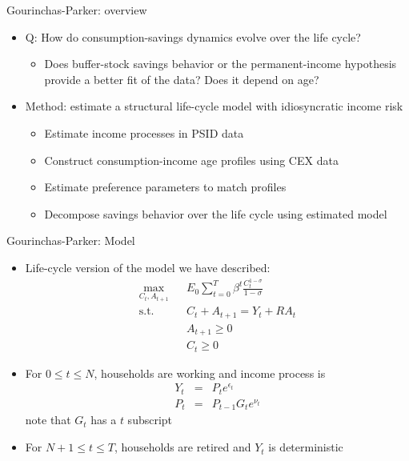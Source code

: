 \documentclass[9pt]{beamer}
\newcommand{\bit}{\begin{itemize}}
\newcommand{\eit}{\end{itemize}}
\begin{document}
\begin{frame}{Gourinchas-Parker: overview}

\bit
\setlength\itemsep{1.5em}
\item Q: How do consumption-savings dynamics evolve over the life cycle?
\bit
	\item Does buffer-stock savings behavior or the permanent-income hypothesis provide a better fit of the data? Does it depend on age?
\eit

\item Method: estimate a structural life-cycle model with idiosyncratic income risk
\bit
\setlength\itemsep{0.5em}
	\item Estimate income processes in PSID data 
	
	\item Construct consumption-income age profiles using CEX data
	
	\item Estimate preference parameters to match profiles
	
	\item Decompose savings behavior over the life cycle using estimated model
\eit

\eit

\end{frame}


\begin{frame}{Gourinchas-Parker: Model}

\bit
\setlength\itemsep{1.5em}
\item Life-cycle version of the model we have described:
\begin{eqnarray}
\max_{C_t, A_{t+1}} && E_0 \sum_{t=0}^{T} \beta^t \frac{C_t^{1-\sigma}}{1-\sigma} \nonumber \\
\text{s.t.} && C_t + A_{t+1} = Y_t + R A_t \nonumber \\
&& A_{t+1} \geq 0 \nonumber \\
&& C_{t} \geq 0 \nonumber
\end{eqnarray}

\item For $0 \leq t \leq N$, households are working and income process is
\begin{eqnarray}
Y_{t} &=& P_{t} e^{\epsilon_{t}} \nonumber \\
P_{t} &=& P_{t-1}G_t e^{\nu_{t}} \nonumber 
\end{eqnarray}
note that $G_t$ has a $t$ subscript

\item For $N+1 \leq t \leq T$, households are retired and $Y_t$ is deterministic

\eit

\end{frame}
\end{document}
